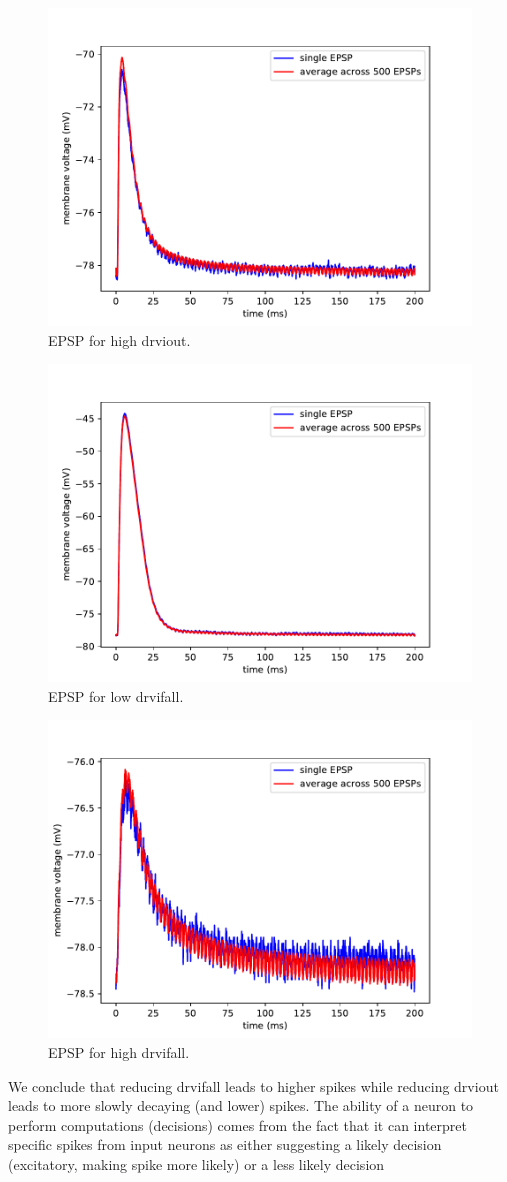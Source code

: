 \documentclass[a4paper,twocolumn]{article}
\begin{document}
\begin{figure}[ht]
    \centering
    \includegraphics[width=.5\textwidth]{figures/epsp_out_+.pdf}
    \caption{EPSP for high drviout.}
    \label{fig:epsp_out+}
\end{figure}
\begin{figure}[ht]
    \centering
    \includegraphics[width=.5\textwidth]{figures/epsp_fall_-.pdf}
    \caption{EPSP for low drvifall.}
    \label{fig:epsp_fall-}
\end{figure}
\begin{figure}[ht]
    \centering
    \includegraphics[width=.5\textwidth]{figures/epsp_fall_+.pdf}
    \caption{EPSP for high drvifall.}
    \label{fig:epsp_fall+}
\end{figure}
We conclude that reducing drvifall leads to higher spikes while reducing drviout 
leads to more slowly decaying (and lower) spikes.
The ability of a neuron to perform computations (decisions) comes from the fact 
that it can interpret specific spikes from input neurons as either suggesting 
a likely decision (excitatory,  making spike more likely) or  a less likely decision 
\end{document}
